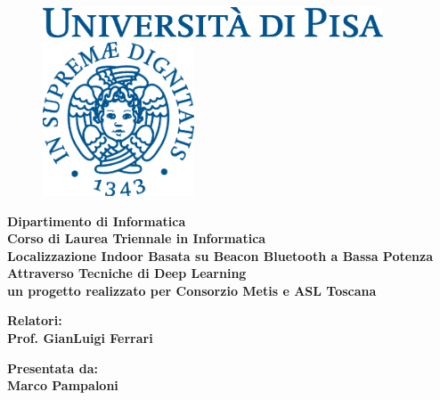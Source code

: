 \documentclass[12pt]{report}
\begin{document}
\begin{titlepage}
  \begin{figure}[t]
    \centering\includegraphics[width=0.9\textwidth]{./img/logo.eps}
    
    \vspace{1cm}
    
    \centering\includegraphics[width=0.4\textwidth]{./img/cherubino.eps}
  \end{figure}

  \begin{center}
    \textbf{ Dipartimento di Informatica\\ Corso di Laurea Triennale in Informatica\\}
    \vspace{15mm}
    {\LARGE{\bf Localizzazione Indoor Basata su Beacon Bluetooth a Bassa Potenza
    Attraverso Tecniche di Deep Learning}}\\
    {\large{\bf un progetto realizzato per Consorzio Metis e ASL Toscana}} \\
  \end{center}

  \vspace{20mm}

  \begin{minipage}[t]{0.47\textwidth}
    {\large{\bf Relatori:\\ Prof. GianLuigi Ferrari 
    }}
  \end{minipage}\hfill
  \begin{minipage}[t]{0.47\textwidth}\raggedleft
    {\large{\bf Presentata da: \\ Marco Pampaloni}}
  \end{minipage}

  \vfill



\end{titlepage}
\end{document}
